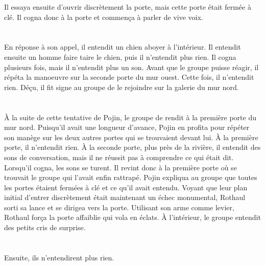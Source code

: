 \documentclass[main.tex]{subfiles}
\begin{document}
    Il essaya ensuite d'ouvrir discrètement la porte, mais cette porte était fermée à clé.
    Il cogna donc à la porte et commença à parler de vive voix.\\
    \\
    \\
    En réponse à son appel, il entendit un chien aboyer à l'intérieur.
    Il entendit ensuite un homme faire taire le chien, puis il n'entendit plus rien.
    Il cogna plusieurs fois, mais il n'entendit plus un son.
    Avant que le groupe puisse réagir, il répéta la manoeuvre sur la seconde porte du mur ouest.
    Cette fois, il n'entendit rien.
    Déçu, il fit signe au groupe de le rejoindre sur la galerie du mur nord.\\
    \\
    \\
    À la suite de cette tentative de Pojin, le groupe de rendit à la première porte du mur nord.
    Puisqu'il avait une longueur d'avance, Pojin en profita pour répéter son manège sur les deux autres portes qui se trouvaient devant lui.
    À la première porte, il n'entendit rien.
    À la seconde porte, plus près de la rivière, il entendit des sons de conversation, mais il ne réussit pas à comprendre ce qui était dit.
    Lorsqu'il cogna, les sons se turent.
    Il revint donc à la première porte où se trouvait le groupe qui l'avait enfin rattrapé.
    Pojin expliqua au groupe que toutes les portes étaient fermées à clé et ce qu'il avait entendu.
    Voyant que leur plan initial d'entrer discrètement était maintenant un échec monumental, Rothaul sorti sa lance et se dirigea vers la porte.
    Utilisant son arme comme levier, Rothaul força la porte affaiblie qui vola en éclats.
    À l'intérieur, le groupe entendit des petits cris de surprise.\\
    \\
    \\
    Ensuite, ils n'entendirent plus rien.
\end{document}
